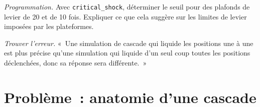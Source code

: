\begin{exercise}[$\star\star\star$]\label{exo:m3:margin-liquidation-and-loss-allocation:7}
\emph{Programmation.} Avec \texttt{critical\_shock}, déterminer le seuil pour des plafonds de levier de 20 et de 10 fois. Expliquer
ce que cela suggère sur les limites de levier imposées par les plateformes.
\end{exercise}

\begin{exercise}[$\star\star\star$]\label{exo:m3:margin-liquidation-and-loss-allocation:8}
\emph{Trouver l'erreur.} «~Une simulation de cascade qui liquide les positions une à une est plus précise qu'une simulation qui
liquide d'un seul coup toutes les positions déclenchées, donc sa réponse sera différente.~»
\end{exercise}

\section{Problème~: anatomie d'une cascade}


